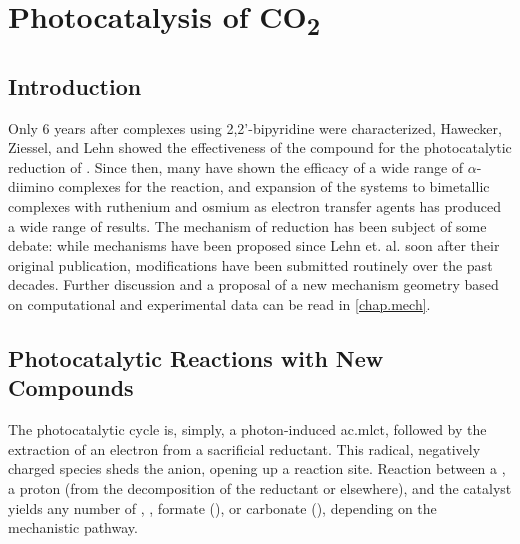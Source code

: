 \chapter{Photocatalysis of \texorpdfstring{CO\textsubscript{2}}{CO2}}\label{chap.co2}

\section{Introduction}

Only 6 years after  complexes using 2,2'-bipyridine were characterized, Hawecker, Ziessel, and Lehn showed the effectiveness of the compound for the photocatalytic reduction of \autocite{hawecker1983}. Since then, many have shown the efficacy of a wide range of $\alpha$-diimino complexes for the reaction, and expansion of the systems to bimetallic complexes with ruthenium and osmium as electron transfer agents has produced a wide range of results. The mechanism of reduction has been subject of some debate: while mechanisms have been proposed since Lehn et. al. soon after their original publication\autocite{hawecker1986}, modifications have been submitted routinely over the past decades. Further discussion and a proposal of a new mechanism geometry based on computational and experimental data can be read in \autoref{chap.mech}.

\section{Photocatalytic Reactions with New Compounds}

The photocatalytic cycle is, simply, a photon-induced \gls{ac.mlct}, followed by the extraction of an electron from a sacrificial reductant. This radical, negatively charged species sheds the anion, opening up a reaction site. Reaction between a , a proton (from the decomposition of the reductant or elsewhere), and the catalyst yields any number of , , formate (), or carbonate (), depending on the mechanistic pathway. 

